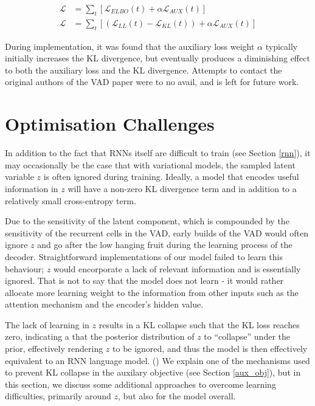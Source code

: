 \documentclass[12pt,twoside]{report}
\begin{document}
\begin{equation}
	\begin{split}
		\mathcal{L} &= \sum_t [\mathcal{L}_{ELBO}(t) + \alpha \mathcal{L}_{AUX}(t)] \\
		\mathcal{L} &= \sum_t [(\mathcal{L}_{LL}(t) - \mathcal{L}_{KL}(t)) + \alpha \mathcal{L}_{AUX}(t)] 
	\end{split}
\end{equation}

During implementation, it was found that the auxiliary loss weight $\alpha$ typically initially increases the KL divergence, but eventually produces a diminishing effect to both the auxiliary loss and the KL divergence. Attempts to contact the original authors of the VAD paper were to no avail, and is left for future work. 


\section{Optimisation Challenges}
\label{optimisation_challenges}

In addition to the fact that RNNs itself are difficult to train (see Section \ref{rnn}), it may occasionally be the case that with variational models, the sampled latent variable $z$ is often ignored during training. Ideally, a model that encodes useful information in $z$ will have a non-zero KL divergence term and in addition to a relatively small cross-entropy term. 

Due to the sensitivity of the latent component, which is compounded by the sensitivity of the recurrent cells in the VAD, early builds of the VAD would often ignore $z$ and go after the low hanging fruit during the learning process of the decoder. Straightforward implementations of our model failed to learn this behaviour; $z$ would encorporate a lack of relevant information and is essentially ignored. That is not to say that the model does not learn - it would rather allocate more learning weight to the information from other inputs such as the attention mechanism and the encoder's hidden value.

The lack of learning in $z$ results in a KL collapse such that the KL loss reaches zero, indicating a that the posterior distribution of $z$ to ``collapse'' under the prior, effectively rendering $z$ to be ignored, and thus the model is then effectively equivalent to an RNN language model. (\cite{bowman_generating_2015}) We explain one of the mechanisms used to prevent KL collapse in the auxilary objective (see Section \ref{aux_obj}), but in this section, we discuss some additional approaches to overcome learning difficulties, primarily around $z$, but also for the model overall.
\end{document}

